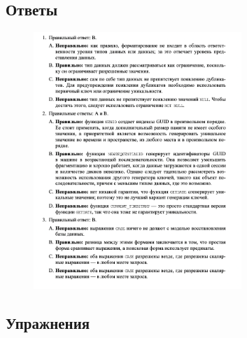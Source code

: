 \subsection*{Ответы}

\begin{figure}[h!]
	\begin{center}
		\includegraphics[width=0.7\textwidth]{img/ans4.png}
	\end{center}
	\captionsetup{justification=centering}
\end{figure}

\newpage
\subsection*{Упражнения}

